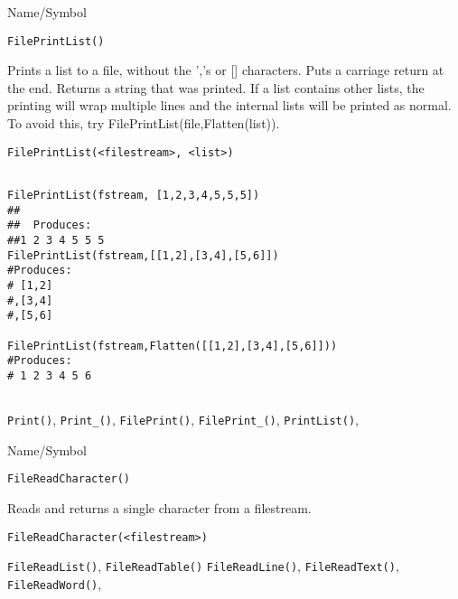\begin{desc}{Name/Symbol}
\item[Name/Symbol]	\verb+FilePrintList()+

\item[Description]	Prints a list to a file, without the ','s or []
  characters. Puts a carriage return at the end.  Returns a string
  that was printed.  If a list contains other lists, the printing will
  wrap multiple lines and the internal lists will be printed as
  normal.  To avoid this, try FilePrintList(file,Flatten(list)).

\item[Usage]
\begin{verbatim}
FilePrintList(<filestream>, <list>)
\end{verbatim}

\item[Example]
\begin{verbatim}

FilePrintList(fstream, [1,2,3,4,5,5,5])
##
##  Produces:
##1 2 3 4 5 5 5
FilePrintList(fstream,[[1,2],[3,4],[5,6]])
#Produces:
# [1,2]
#,[3,4]
#,[5,6]

FilePrintList(fstream,Flatten([[1,2],[3,4],[5,6]]))
#Produces:
# 1 2 3 4 5 6


\end{verbatim}

\item[See Also]	\verb+Print()+, \verb+Print_()+, \verb+FilePrint()+, \verb+FilePrint_()+, \verb+PrintList()+,
\end{desc}



\begin{desc}{Name/Symbol}
\item[Name/Symbol]	\verb+FileReadCharacter()+

\item[Description]	Reads and returns a single character from a filestream.

\item[Usage]
\begin{verbatim}
FileReadCharacter(<filestream>)
\end{verbatim}

\item[Example]	

\item[See Also]	
   \verb+FileReadList()+, \verb+FileReadTable()+
   \verb+FileReadLine()+, 	\verb+FileReadText()+, 	\verb+FileReadWord()+,

\end{desc}



